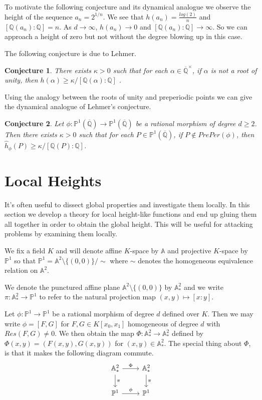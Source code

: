 \documentclass[12pt]{amsart}
\newtheorem{conj}{Conjecture}
\theoremstyle{definition}
\theoremstyle{remark}
\theoremstyle{definition}
\newcommand{\AF}{\mathbb{A}}
\newcommand{\AFAF}{\mathbb{A}^2}
\newcommand{\Q}{\mathbb{Q}}
\renewcommand{\P}{\mathbb{P}}
\begin{document}
To motivate the following conjecture and its dynamical analogue we observe the height of the sequence $a_n = 2^{1/n}$. We see that $h(a_n) = \frac{log(2)}{n}$ and $[\Q(a_n):\Q] = n$. As $d \rightarrow \infty$, $h(a_n) \rightarrow 0$ and $[\Q(a_n):\Q] \rightarrow \infty$. So we can approach a height of zero but not without the degree blowing up in this case.

The following conjecture is due to Lehmer.

\begin{conj}
There exists $\kappa > 0$ such that for each $\alpha \in \overline{\Q}^{\times}$, if $\alpha$ is not a root of unity, then $h(\alpha) \geq \kappa / [\Q(\alpha):\Q]$ .
\end{conj}

Using the analogy between the roots of unity and preperiodic points we can give the  dynamical analogue of Lehmer's conjecture. 

\begin{conj}

Let $\phi: \P^1(\overline{\Q}) \rightarrow \P^1(\overline{\Q})$ be a rational morphism of degree $d \geq 2$. Then there exists $\kappa>0$ such that for each $P \in \P^1(\overline{\Q})$, if $P \notin PrePer(\phi)$, then $\hat{h}_\phi(P) \geq \kappa /[\Q(P):\Q]$.

\end{conj}

\section{Local Heights}
It's often useful to dissect global properties and investigate them locally. In this section we develop a theory for local height-like functions and end up gluing them all together in order to obtain the global height. This will be useful for attacking problems by examining them locally.  

We fix a field $K$ and will denote affine $K$-space by $\AF$ and projective $K$-space by $\P^1$ so that $\P^1 = \AFAF\setminus\{(0,0)\}/\sim$ where $\sim$ denotes the homogeneous equivalence relation on $\AFAF$.

We denote the punctured affine plane $\AFAF\setminus\{(0,0)\}$ by $\AFAF_*$ and we write $\pi: \AFAF_* \rightarrow \P^1$ to refer to the natural projection map $(x,y) \mapsto [x:y]$. 

Let $\phi: \P^1 \rightarrow \P^1$ be a rational morphism of degree $d$ defined over $K$. Then we may write $\phi = [F,G]$ for $F,G \in K[x_0,x_1]$ homogeneous of degree $d$ with $Res(F,G) \neq 0$. We then obtain the map $\Phi: \AFAF_* \rightarrow \AFAF_*$ defined by $\Phi(x,y) = (F(x,y),G(x,y))$ for $(x,y) \in \AFAF_*$. The special thing about $\Phi$, is that it makes the following diagram commute. 
\[\begin{tikzcd}
\AFAF_* \arrow[r, "\Phi"] \arrow[d, "\pi"]
& \AFAF_* \arrow[d, "\pi"] \\
\P^1 \arrow[r, "\phi"]
& \P^1
\end{tikzcd}\]
\end{document}
